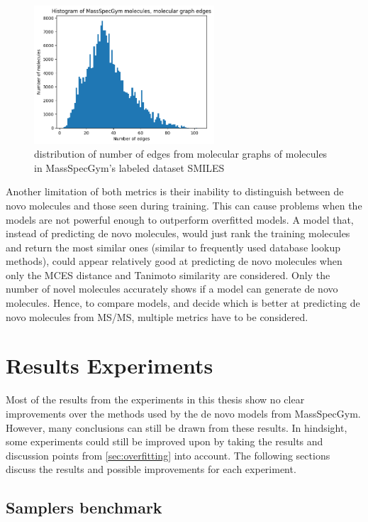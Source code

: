 \begin{figure}[H]
    \centering
    \includegraphics[width=0.6\textwidth]{figures/discussion/number_of_edges_massspecgym.png}
    \caption{distribution of number of edges from molecular graphs of molecules in MassSpecGym's labeled dataset SMILES}
    \label{fig:edges}
\end{figure}


Another limitation of both metrics is their inability to distinguish between de novo molecules and those seen during training.
This can cause problems when the models are not powerful enough to outperform overfitted models.
A model that, instead of predicting de novo molecules, would just rank the training molecules and return the most similar ones (similar to frequently used database lookup methods), could appear relatively good at predicting de novo molecules when only the \ac{MCES} distance and Tanimoto similarity are considered.
Only the number of novel molecules accurately shows if a model can generate de novo molecules.
Hence, to compare models, and decide which is better at predicting de novo molecules from \ac{MS/MS}, multiple metrics have to be considered.

\section{Results Experiments}

Most of the results from the experiments in this thesis show no clear improvements over the methods used by the de novo models from MassSpecGym.
However, many conclusions can still be drawn from these results.
In hindsight, some experiments could still be improved upon by taking the results and discussion points from \ref{sec:overfitting} into account.
The following sections discuss the results and possible improvements for each experiment.

\subsection{Samplers benchmark}

